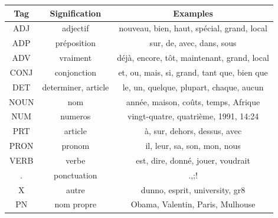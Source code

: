 \documentclass[french,12pt]{article}
\begin{document}
\begin{tabular}{|c|c|c|}

\hline

Tag & Signification & Examples \\

\hline

ADJ & adjectif & nouveau, bien, haut, spécial, grand, local \\

\hline

ADP & préposition & sur, de, avec, dans, sous \\

\hline

ADV & vraiment & déjà, encore, tôt, maintenant, grand, local \\
\hline

CONJ & conjonction & et, ou, mais, si, grand, tant que, bien que \\
\hline

DET & determiner, article & le, un, quelque, plupart, chaque, aucun \\
\hline

NOUN & nom & année, maison, coûts, temps, Afrique \\
\hline

NUM & numeros & vingt-quatre, quatrième, 1991, 14:24 \\
\hline

PRT & article & à, sur, dehors, dessus, avec \\
\hline

PRON & pronom & il, leur, sa, son, mon, nous \\
\hline

VERB & verbe & est, dire, donné, jouer, voudrait \\
\hline

. & ponctuation & .,;! \\
\hline

X & autre & dunno, esprit, university, gr8 \\
\hline

PN & nom propre & Obama, Valentin, Paris, Mulhouse \\

\hline

\end{tabular}
\end{document}

